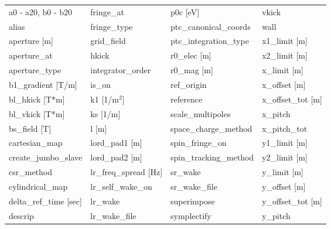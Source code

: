  \begin{tabular}{llll} \toprule
a0 - a20, b0 - b20             & fringe_at                      & p0c [eV]                       & vkick                          \\
alias                          & fringe_type                    & ptc_canonical_coords           & wall                           \\
aperture [m]                   & grid_field                     & ptc_integration_type           & x1_limit [m]                   \\
aperture_at                    & hkick                          & r0_elec [m]                    & x2_limit [m]                   \\
aperture_type                  & integrator_order               & r0_mag [m]                     & x_limit [m]                    \\
b1_gradient [T/m]              & is_on                          & ref_origin                     & x_offset [m]                   \\
bl_hkick [T*m]                 & k1 [1/m$^2$]                   & reference                      & x_offset_tot [m]               \\
bl_vkick [T*m]                 & ks [1/m]                       & scale_multipoles               & x_pitch                        \\
bs_field [T]                   & l [m]                          & space_charge_method            & x_pitch_tot                    \\
cartesian_map                  & lord_pad1 [m]                  & spin_fringe_on                 & y1_limit [m]                   \\
create_jumbo_slave             & lord_pad2 [m]                  & spin_tracking_method           & y2_limit [m]                   \\
csr_method                     & lr_freq_spread [Hz]            & sr_wake                        & y_limit [m]                    \\
cylindrical_map                & lr_self_wake_on                & sr_wake_file                   & y_offset [m]                   \\
delta_ref_time [sec]           & lr_wake                        & superimpose                    & y_offset_tot [m]               \\
descrip                        & lr_wake_file                   & symplectify                    & y_pitch                        \\

\end{tabular}
